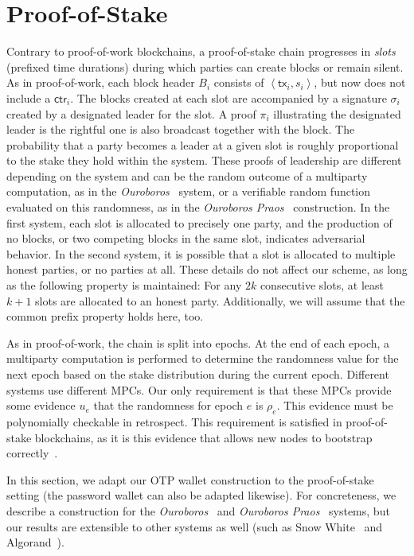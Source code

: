 \section{Proof-of-Stake}

Contrary to proof-of-work blockchains, a proof-of-stake chain progresses in \emph{slots}
(prefixed time durations) during which
parties can create blocks or remain silent.
As in proof-of-work, each block header $B_i$ consists of $\left<\textsf{tx}_i, s_i\right>$, but now
does not include a $\textsf{ctr}_i$.
The blocks created at each slot are accompanied by a
signature $\sigma_i$ created by a designated leader for the slot.
A proof $\pi_i$ illustrating the designated leader is the rightful one
is also broadcast together with the block.
The probability that a party becomes a leader at a given slot is roughly
proportional to the stake they hold within the system.
These proofs of leadership are different depending on the system and can
be the random outcome of a multiparty computation, as in the \emph{Ouroboros}~\cite{ouroboros} system,
or a verifiable random function~\cite{FOCS:MicRabVad99} evaluated on this randomness, as in
the \emph{Ouroboros Praos}~\cite{praos} construction.
In the first system,
each slot is allocated to precisely one party, and the production of no blocks, or two competing blocks in the
same slot, indicates adversarial behavior. In the second system, it is possible that a slot is allocated
to multiple honest parties, or no parties at all. These details do not affect our scheme, as long as the following
property is maintained: For any $2k$ consecutive slots, at least $k+1$ slots are allocated to an honest
party. Additionally, we will assume that the common prefix property holds here, too.

As in proof-of-work, the chain is split into epochs.
At the end of each epoch, a multiparty computation is performed to determine
the randomness value for the next epoch based on the stake distribution during the current epoch.
Different systems use different MPCs. Our only requirement is that these MPCs provide some
evidence $u_e$ that the randomness for epoch $e$ is $\rho_e$. This evidence must be
polynomially checkable in retrospect. This requirement is satisfied in proof-of-stake blockchains,
as it is this evidence that allows new nodes to bootstrap correctly~\cite{ouroboros-genesis}.

In this section, we adapt our OTP wallet construction to the proof-of-stake setting (the password wallet can also
be adapted likewise). For concreteness, we describe
a construction for the \emph{Ouroboros}~\cite{ouroboros} and \emph{Ouroboros Praos}~\cite{praos}
systems, but our results are extensible to other systems as well (such as Snow
White~\cite{DBLP:journals/iacr/BentovPS16a} and Algorand~\cite{algorand}).

